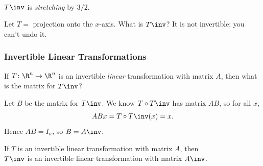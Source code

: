 \begin{frame}
\hfill\null\\[1mm]
\pause
$T\inv$ is \emph{stretching} by $3/2$.

\pause\medskip
Let $T = $ projection onto the $x$-axis.  What is $T\inv$?
\pause
It is not invertible: you can't undo it.

\end{frame}



\begin{frame}
\frametitle{Invertible Linear Transformations}

If $T\colon\R^n\to\R^n$ is an invertible \emph{linear} transformation with
matrix $A$, then what is the matrix for $T\inv$?

\medskip
\begin{webonly}
Let $B$ be the matrix for $T\inv$.
We know $T\circ T\inv$ has matrix $AB$, so for all $x$,
\[ ABx = T\circ T\inv(x) = x. \]
Hence $AB = I_n$, so $B = A\inv$.
\end{webonly}

\pause\vskip 1cm
\begin{bluebox}[Fact]{.85\linewidth}
  If $T$ is an invertible linear transformation with matrix $A$, then\\[1mm]
  $T\inv$ is an invertible linear transformation with matrix $A\inv$.
\end{bluebox}

\end{frame}


